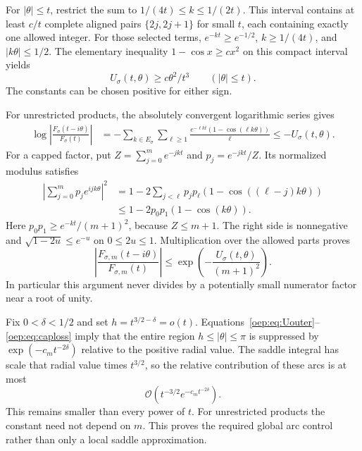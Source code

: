 \documentclass[11pt,letterpaper]{article}
\theoremstyle{remark}\newtheorem{remark}[theorem]{Remark}
\newcommand{\OO}{\mathcal O}
\begin{document}
For $|\theta|\leq t$, restrict the sum to $1/(4t)\leq k\leq1/(2t)$. This interval contains at least $c/t$ complete aligned pairs $\{2j,2j+1\}$ for small $t$, each containing exactly one allowed integer. For those selected terms, $e^{-kt}\geq e^{-1/2}$, $k\geq1/(4t)$, and $|k\theta|\leq1/2$. The elementary inequality $1-\cos x\geq c x^2$ on this compact interval yields
\begin{equation}\label{oep:eq:Uinner}
 U_\sigma(t,\theta)\geq c\theta^2/t^3\qquad(|\theta|\leq t).
\end{equation}
The constants can be chosen positive for either sign.

For unrestricted products, the absolutely convergent logarithmic series gives
\begin{align}\label{oep:eq:unresloss}
 \log\left|\frac{F_\sigma(t-i\theta)}{F_\sigma(t)}\right|
 &=-\sum_{k\in E_\sigma}\sum_{\ell\geq1}
       \frac{e^{-\ell kt}(1-\cos(\ell k\theta))}{\ell}
 \leq-U_\sigma(t,\theta).
\end{align}
For a capped factor, put $Z=\sum_{j=0}^me^{-jkt}$ and $p_j=e^{-jkt}/Z$. Its normalized modulus satisfies
\begin{align*}
 \left|\sum_{j=0}^mp_je^{ijk\theta}\right|^2
 &=1-2\sum_{j<\ell}p_jp_\ell(1-\cos((\ell-j)k\theta))\\
 &\leq1-2p_0p_1(1-\cos(k\theta)).
\end{align*}
Here $p_0p_1\geq e^{-kt}/(m+1)^2$, because $Z\leq m+1$. The right side is nonnegative and $\sqrt{1-2u}\leq e^{-u}$ on $0\leq2u\leq1$. Multiplication over the allowed parts proves
\begin{equation}\label{oep:eq:caploss}
 \left|\frac{F_{\sigma,m}(t-i\theta)}{F_{\sigma,m}(t)}\right|
 \leq\exp\!\left(-\frac{U_\sigma(t,\theta)}{(m+1)^2}\right).
\end{equation}
In particular this argument never divides by a potentially small numerator factor near a root of unity.

Fix $0<\delta<1/2$ and set $h=t^{3/2-\delta}=o(t)$. Equations~\eqref{oep:eq:Uouter}--\eqref{oep:eq:caploss} imply that the entire region $h\leq|\theta|\leq\pi$ is suppressed by $\exp(-c_m t^{-2\delta})$ relative to the positive radial value. The saddle integral has scale that radial value times $t^{3/2}$, so the relative contribution of these arcs is at most
\begin{equation}\label{oep:eq:minorrelative}
 \OO\!\left(t^{-3/2}e^{-c_m t^{-2\delta}}\right).
\end{equation}
This remains smaller than every power of $t$. For unrestricted products the constant need not depend on $m$. This proves the required global arc control rather than only a local saddle approximation.
\end{document}
